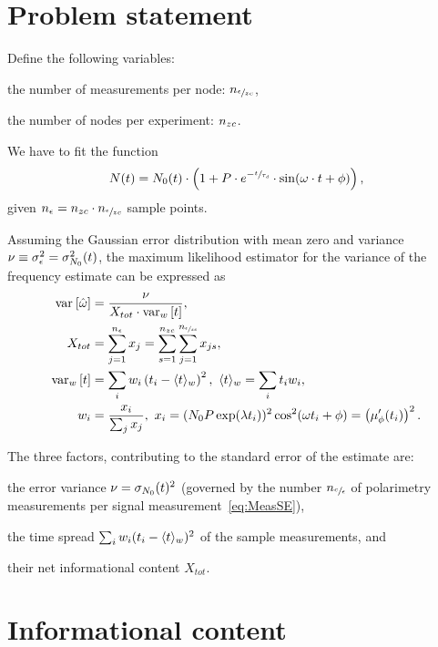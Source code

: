 \documentclass{article}
\newcommand{\dt}{\Delta t}
\begin{document}
\section{Problem statement}
Define the following variables: \begin{inparaenum}
	\item the number of measurements per node: $n_{\sfrac{\epsilon}{zc}}$,
	\item the number of nodes per experiment: $n_{zc}$.
\end{inparaenum}

We have to fit the function
\begin{equation}\label{eq:Signal}
N(t) = N_0(t)\cdot\bkt{1 + P\cdot e^{-\sfrac{t}{\tau_d}}\cdot\sin(\omega\cdot t + \phi)},
\end{equation}
given $n_{\epsilon} = n_{zc}\cdot n_{\sfrac{\epsilon}{zc}}$ sample points.

Assuming the Gaussian error distribution with mean zero and variance $\nu \equiv \SD{\meas}^2 = \SD{N_0}^2(t)$, the maximum likelihood estimator for the variance of the frequency estimate can be expressed as
\begin{align*}
\var{\hat\omega} &= \frac{\nu}{X_{tot}\cdot \var[w]{t}}, \\
X_{tot} &= \sum_{j=1}^{\Nm} x_j = \sum_{s=1}^{\Nnd}\sum_{j=1}^{\Nmnd} x_{js}, \\
\var[w]{t} &= \sum_i w_i \bkt{t_i - \avg{t}_w}^2,~ \avg{t}_w = \sum_i t_i w_i, \\
w_i &= \frac{x_i}{\sum_j x_j},~ x_i = (N_0P\exp(\lambda t_i))^2\cos^2(\omega t_i + \phi) = \bkt{\mupp}^2.
\end{align*}

The three factors, contributing to the standard error of the estimate are:
\begin{inparaenum}
	\item the error variance $\nu = \SD{N_0}(t)^2$ (governed by the number $n_{\sfrac{c}{\epsilon}}$ of polarimetry measurements per signal measurement~\eqref{eq:MeasSE}), 
	\item the time spread $\sum_i w_i (t_i - \langle t\rangle_w)^2$ of the sample measurements, and
	\item their net informational content $X_{tot}$.
\end{inparaenum}


\section{Informational content}
\newcommand{\dtnd}{\dt_{zc}}
\end{document}
